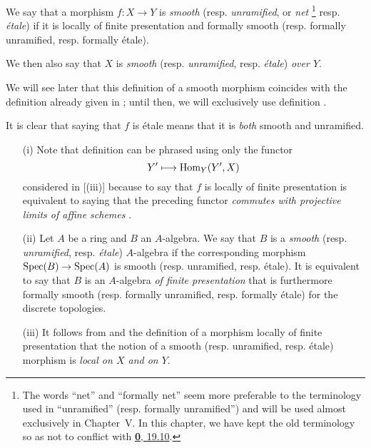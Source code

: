 \begin{definition}[17.3.1]
\label{IV.17.3.1}
We say that a morphism $f:X\to Y$ is \emph{smooth} (resp. \emph{unramified}, or \emph{net}
\footnote{The words ``net'' and ``formally net'' seem more preferable to the terminology used in ``unramified'' (resp. formally unramified'') and will be used almost exclusively in Chapter~V.
In this chapter, we have kept the old terminology so as not to conflict with \hyperref[subsection:IV.19.10]{\textbf{0}, 19.10}.}
resp. \emph{\'etale})
if it is locally of finite presentation and formally smooth (resp. formally unramified, resp. formally \'etale).
\end{definition}

We then also say that $X$ is \emph{smooth} (resp. \emph{unramified}, resp. \emph{\'etale}) \emph{over $Y$}.

We will see later  that this definition of a smooth morphism coincides with the definition already given in ;
until then, we will exclusively use definition .

It is clear that saying that $f$ is \'etale means that it is \emph{both} smooth and unramified.

\begin{remark}[17.3.2]
\label{IV.17.3.2}
\medskip\noindent
\begin{enumerate}
  \item[(i)] Note that definition  can be phrased using only the functor
    \[
      Y'\mapsto\Hom_Y(Y',X)
    \]
    considered in [(iii)] because to say that $f$ is locally of finite presentation is equivalent to saying that the preceding functor \emph{commutes with projective limits of affine schemes} .
  \item[(ii)] Let $A$ be a ring and $B$ an $A$-algebra. 
   We say that $B$ is a \emph{smooth} (resp. \emph{unramified}, resp. \emph{\'etale}) $A$-algebra if the corresponding morphism $\Spec(B)\to\Spec(A)$ is smooth (resp. unramified, resp. \'etale).
   It is equivalent to say that $B$ is an $A$-algebra \emph{of finite presentation}  that is furthermore formally smooth (resp. formally unramified, resp. formally \'etale) for the discrete topologies.
  \item[(iii)] It follows from  and the definition of a morphism locally of finite presentation  that the notion of a smooth (resp. unramified, resp. \'etale) morphism is \emph{local on $X$ and on $Y$}.
\end{enumerate}
\end{remark}


